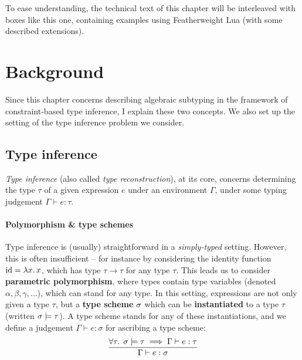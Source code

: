 \begin{example}
    To ease understanding, the technical text of this chapter will be interleaved with boxes like this one, containing examples using Featherweight Lua (with some described extensions).
\end{example}

\section{Background}
\label{sec:ch3background}

Since this chapter concerns describing algebraic subtyping in the framework of constraint-based type inference, I explain these two concepts. We also set up the setting of the type inference problem we consider. 

\subsection{Type inference}
\emph{Type inference} (also called \emph{type reconstruction}), at its core, concerns determining the type $\tau$ of a given expression $e$ under an environment $\Gamma$, under some typing judgement $\Gamma \vdash e : \tau$.

\paragraph{Polymorphism \& type schemes} Type inference is (usually) straightforward in a \emph{simply-typed} setting. However, this is often insufficient -- for instance by considering the identity function $\mathrm{id} =  \lambda x \ldotp x$, which has type $\tau \to \tau$ for any type $\tau$.
This leads us to consider \textbf{parametric polymorphism}, where types contain type variables (denoted $\alpha, \beta, \gamma, \dots$), which can stand for any type. 
In this setting, expressions are not only given a type $\tau$, but a \textbf{type scheme} $\sigma$ which can be \textbf{instantiated} to a type $\tau$ (written $\sigma \models \tau$). A type scheme stands for any of these instantiations, and we define a judgement $\Gamma \vdash e : \sigma$ for ascribing a type scheme:
$$ \dfrac{\forall \tau \ldotp\; \sigma \models \tau \implies \Gamma \vdash e : \tau}{\Gamma \vdash e : \sigma} $$

